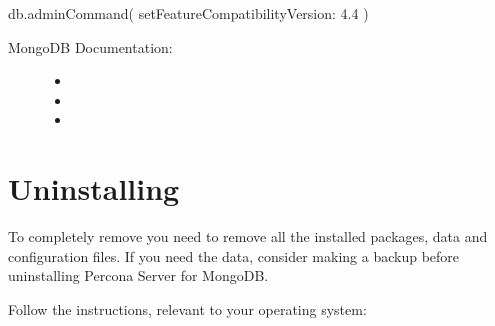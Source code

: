 \documentclass[letterpaper,10pt,english]{sphinxmanual}
\begin{document}
\begin{sphinxVerbatim}[commandchars=\\\{\}]
db.adminCommand( \PYGZob{} setFeatureCompatibilityVersion: \PYGZdq{}4.4\PYGZdq{} \PYGZcb{} )
\end{sphinxVerbatim}


\nopagebreak

\begin{description}
\item[{MongoDB Documentation:}] \leavevmode\begin{itemize}
\item {} 
\sphinxAtStartPar
{}

\item {} 
\sphinxAtStartPar
{}

\item {} 
\sphinxAtStartPar
{}

\end{itemize}

\end{description}




\chapter{Uninstalling }
\label{\detokenize{install/uninstall:uninstalling-psmdb}}\label{\detokenize{install/uninstall:uninstall}}\label{\detokenize{install/uninstall::doc}}
\sphinxAtStartPar
To completely remove  you need to remove all the installed packages, data and configuration files. If you need the data, consider making a backup before uninstalling Percona Server for MongoDB.

\sphinxAtStartPar
Follow the instructions, relevant to your operating system:
\end{document}
